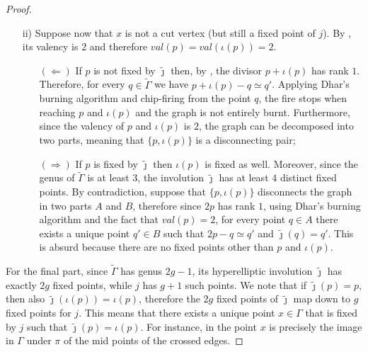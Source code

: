 \documentclass[11pt]{article}
\theoremstyle{definition}
\numberwithin{equation}{section}
\theoremstyle{definition}
\newcommand{\tGa}{\widetilde{\Gamma}}
\newcommand{\Ga}{\Gamma}
\newcommand{\tj}{\widetilde{\jmath}}
\begin{document}
{\begin{proof}
\begin{itemize}
\begin{itemize}
                \item [$(\Rightarrow)$] If $p$ is a fixed point of $\tj$ then, from  applied to both $p$ and $x$, we conclude that the valency of $p$ is at least $4$. Therefore, by applying  to $p$ and $\iota p$, they are both  cut vertices.  
            \end{itemize}
            \item[ii)] Suppose now that $x$ is not a cut vertex (but still a fixed point of $j$). By  , its valency is 2 and therefore $val(p)=val(\iota(p))=2$.
            \begin{itemize}
                \item [$(\Leftarrow)$] If $p$ is not fixed by $\tj$ then, by , the divisor $p+\iota(p)$ has rank $1$. 
                Therefore, for every $q\in \tGa$ we have $p+\iota(p)-q\simeq q'$. Applying Dhar's burning algorithm and chip-firing from the point $q$, the fire stops when reaching $p$ and $\iota(p)$ and the graph is not entirely burnt. Furthermore, since the valency of $p$ and  $\iota(p)$ is $2$, the graph can be decomposed into two parts,
meaning that $\{p,\iota(p)\}$ is a disconnecting pair;
                \item [$(\Rightarrow)$] If $p$ is fixed by $\tj$ then  $\iota(p)$ is fixed as well. Moreover, since the genus of $\tGa$ is at least $3$, the involution $\tj$ has at least $4$ distinct fixed points. By contradiction, suppose that $\{p,\iota(p)\}$ disconnects the graph in two parts $A$ and $B$, therefore since $2p$ has rank $1$, using Dhar's burning algorithm and the fact that $val(p)=2$,
                for every point $q\in A$ there exists a unique point $q'\in B$ such that $2p-q\simeq q'$ and $\tj(q)=q'$. This is absurd because there are no fixed points other than $p$ and $\iota(p)$.
            \end{itemize}
        \end{itemize}

                For the final part, 
since $\tGa$ has genus $2g-1$, its hyperelliptic involution $\tj$ has exactly $2g$ fixed points, while $j$ has $g+1$ such points. We note that if $\tj(p)=p$, then also  $\tj(\iota(p))=\iota(p)$, therefore  the $2g$ fixed points of $\tj$ map down to $g$ fixed points for $j$. This means that there exists a unique  point $x\in \Gamma$ that is fixed by $j$ such that $\tj(p)=\iota(p)$. For instance, in  the point $x$ is precisely the image in $\Ga$ under $\pi$ of the mid points of the crossed edges.
    \end{proof}

}
\end{document}
